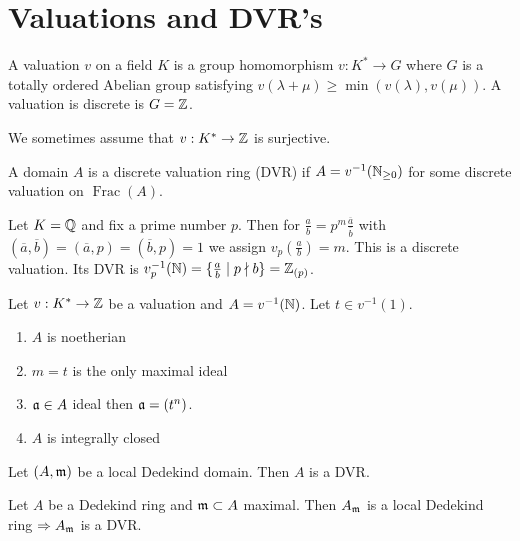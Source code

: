 \documentclass[12pt, a4paper]{article}
\DeclareMathOperator{\Frac}{Frac}
\begin{document}

	\section{Valuations and DVR's}

	\begin{Def}{}{}
		A valuation $v$ on a field $K$ is a group homomorphism $v: K^{*} \to G$
		where $G$ is a totally ordered Abelian group satisfying $v(\lambda 
		+ \mu) \geq \min(v(\lambda), v(\mu ))$. A valuation is discrete 
		is $G = \Z$. 
	\end{Def}

	\begin{rem}
		We sometimes assume that $v: K^{*} \to \Z$ is surjective.
	\end{rem}

	\begin{Def}{}{}
		A domain $A$ is a discrete valuation ring (DVR) if $A = v^{-1}(\N_{\geq 0}
		)$ 
		for some discrete valuation on $\Frac(A)$.
	\end{Def}
	\begin{ex}
		Let $K = \Q$ and fix a prime number $p$. Then for $\frac{a}{b} = 
		p^m \frac{\overline{a}}{\overline{b}}$ with $(\overline{a}, \overline{b}) 
		= (\overline{a}, p) = (\overline{b}, p) = 1$ we assign $v_p(\frac{a}{b}) 
		= m$. This is a discrete valuation. Its DVR is $v_p^{-1}(\N) = 
		\{\frac{a}{b} \mid p \nmid b\} = \Z_{(p)} $.
	\end{ex}

	\begin{prop}{}{}
		Let $v: K^* \to \Z$ be a valuation and $A = v^{-1}(\N)$. Let 
		$t \in v^{-1}(1)$.

		\begin{enumerate}[label = (\roman*)]
			\item $A$ is noetherian
			\item $m = t$ is the only maximal ideal
			\item $\aa \in A$ ideal then $\aa = (t^n)$.
			\item $A$ is integrally closed
		\end{enumerate}
	\end{prop}

	\begin{thm}{}{}
		Let $(A, \mm)$ be a local Dedekind domain. Then $A$ is a DVR.	
	\end{thm}

	\begin{rem}
		Let $A$ be a Dedekind ring and $\mm \subset A$ maximal. Then 
		$A_\mm$ is a local Dedekind ring $\implies A_\mm$ is a DVR.
	\end{rem}
\end{document}
